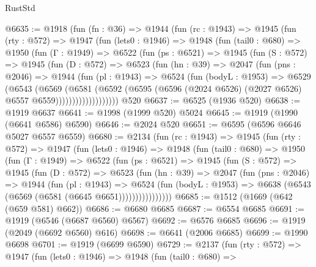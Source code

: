 \begin{lexlean}{RustStd}
\begin{coremodule}
@6635 := @1918
    (fun (fn : @36) =>
    @1944
      (fun (rc : @1943) =>
      @1945
        (fun (rty : @572) =>
        @1947
          (fun (lets0 : @1946) =>
          @1948
            (fun (tail0 : @680) =>
            @1950
              (fun (Γ : @1949) =>
              @6522
                (fun (ps : @6521) =>
                @1945
                  (fun (S : @572) =>
                  @1945
                    (fun (D : @572) =>
                    @6523
                      (fun (hn : @39) =>
                      @2047
                        (fun (pns : @2046) =>
                        @1944
                          (fun (pl : @1943) =>
                          @6524
                            (fun (bodyL : @1953) =>
                            @6529
                              (@6543
                                (@6569
                                  (@6581
                                    (@6592
                                      (@6595
                                        (@6596
                                          (@2024 @6526)
                                          (@2027 @6526)
                                          @6557
                                          @6559)))))))))))))))))))
    @520
@6637 := @6525 (@1936 @520)
@6638 := @1919 @6637
@6641 := @1998 (@1999 @520) @5024
@6645 := @1919 (@1990 (@6641 @6586) @6590)
@6646 := @2024 @520
@6651 := @6595 (@6596 @6646 @5027 @6557 @6559)
@6680 := @2134
    (fun (rc : @1943) =>
    @1945
      (fun (rty : @572) =>
      @1947
        (fun (lets0 : @1946) =>
        @1948
          (fun (tail0 : @680) =>
          @1950
            (fun (Γ : @1949) =>
            @6522
              (fun (ps : @6521) =>
              @1945
                (fun (S : @572) =>
                @1945
                  (fun (D : @572) =>
                  @6523
                    (fun (hn : @39) =>
                    @2047
                      (fun (pns : @2046) =>
                      @1944
                        (fun (pl : @1943) =>
                        @6524
                          (fun (bodyL : @1953) =>
                          @6638 (@6543 (@6569 (@6581 (@6645 @6651))))))))))))))))
@6685 := @1512 (@1669 (@642 (@659 @581) @662))
@6686 := @6680 @6685
@6687 := @6554 @6685
@6691 := @1919 (@6546 (@6687 @6560) @6567)
@6692 := @6576 @6685
@6696 := @1919 (@2049 (@6692 @6560) @616)
@6698 := @6641 (@2006 @6685)
@6699 := @1990 @6698
@6701 := @1919 (@6699 @6590)
@6729 := @2137
    (fun (rty : @572) =>
    @1947
      (fun (lets0 : @1946) =>
      @1948
        (fun (tail0 : @680) =>

\end{coremodule}
\end{lexlean}
